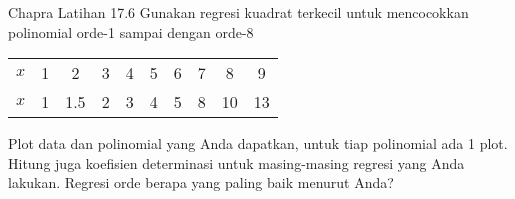 \begin{soal}{Chapra Latihan 17.6}
Gunakan regresi kuadrat terkecil untuk mencocokkan polinomial
orde-1 sampai dengan orde-8

{\centering
\begin{tabular}{|c|ccccccccc|}
\hline
$x$ & 1 & 2 & 3 & 4 & 5 & 6 & 7 & 8 & 9 \\
$x$ & 1 & 1.5 & 2 & 3 & 4 & 5 & 8 & 10 & 13 \\
\hline
\end{tabular}
\par}

Plot data dan polinomial yang Anda dapatkan, untuk tiap polinomial
ada 1 plot. Hitung juga koefisien determinasi untuk masing-masing
regresi yang Anda lakukan. Regresi orde berapa yang paling baik menurut Anda?
\end{soal}